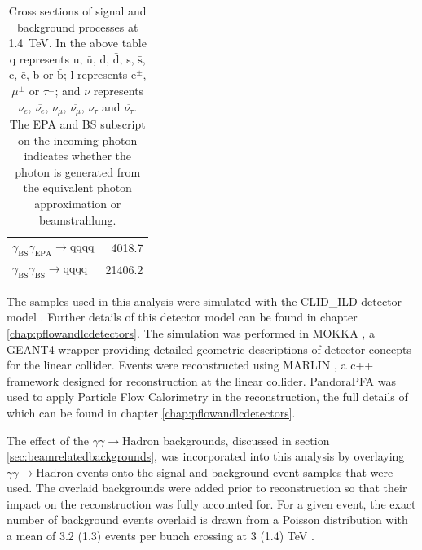 \begin{table}[h!]
\begin{tabular}{ l r }
$\gamma_{\text{BS}}\gamma_{\text{EPA}} \rightarrow \text{qqqq}$ & 4018.7\\
$\gamma_{\text{BS}}\gamma_{\text{BS}} \rightarrow \text{qqqq}$ & 21406.2\\
\hline
\end{tabular}
\caption[Cross sections of signal and background processes at 1.4~TeV]{Cross sections of signal and background processes at 1.4~TeV.  In the above table q represents u, $\bar{\text{u}}$, d, $\bar{\text{d}}$, s, $\bar{\text{s}}$, c, $\bar{\text{c}}$, b or $\bar{\text{b}}$;  l represents $\text{e}^{\pm}$, $\mu^{\pm}$ or $\tau^{\pm}$; and $\nu$ represents $\nu_{e}$, $\overline{\nu_{e}}$, $\nu_{\mu}$, $\overline{\nu_{\mu}}$, $\nu_{\tau}$ and $\overline{\nu_{\tau}}$.  The EPA and BS subscript on the incoming photon indicates whether the photon is generated from the equivalent photon approximation or beamstrahlung.}
\label{table:crosssection1400GeV}
\end{table}

The samples used in this analysis were simulated with the CLID\_ILD detector model \cite{arXiv:1006.3396}.  Further details of this detector model can be found in chapter \ref{chap:pflowandlcdetectors}.  The simulation was performed in MOKKA \cite{MoradeFreitas:2002kj}, a GEANT4 \cite{Agostinelli:2002hh} wrapper providing detailed geometric descriptions of detector concepts for the linear collider.  Events were reconstructed using MARLIN \cite{Gaede:2006pj}, a c++ framework designed for reconstruction at the linear collider.  PandoraPFA \cite{arXiv:0907.3577, arXiv:1209.4039} was used to apply Particle Flow Calorimetry in the reconstruction, the full details of which can be found in chapter \ref{chap:pflowandlcdetectors}.
  
The effect of the $\gamma\gamma \rightarrow \text{Hadron}$ backgrounds, discussed in section \ref{sec:beamrelatedbackgrounds}, was incorporated into this analysis by overlaying $\gamma\gamma \rightarrow \text{Hadron}$ events onto the signal and background event samples that were used.  The overlaid backgrounds were added prior to reconstruction so that their impact on the reconstruction was fully accounted for.  For a given event, the exact number of background events overlaid is drawn from a Poisson distribution with a mean of 3.2 (1.3) events per bunch crossing at 3 (1.4) TeV \cite{Linssen:2012hp}.  
 

